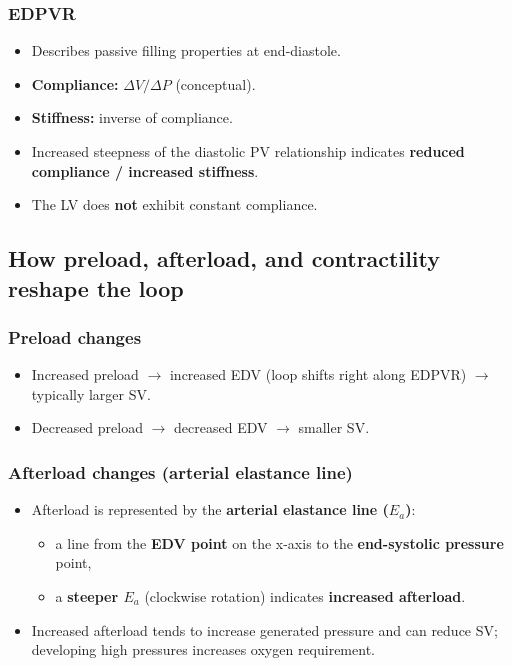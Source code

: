 \documentclass[11pt,a4paper]{article}
\begin{document}
\subsubsection{EDPVR}
\begin{itemize}
\item Describes passive filling properties at end-diastole.
\item \textbf{Compliance:} $\Delta V/\Delta P$ (conceptual).
\item \textbf{Stiffness:} inverse of compliance.
\item Increased steepness of the diastolic PV relationship indicates \textbf{reduced compliance / increased stiffness}.
\item The LV does \textbf{not} exhibit constant compliance.
\end{itemize}

\subsection{How preload, afterload, and contractility reshape the loop}

\subsubsection{Preload changes}
\begin{itemize}
\item Increased preload $\rightarrow$ increased EDV (loop shifts right along EDPVR) $\rightarrow$ typically larger SV.
\item Decreased preload $\rightarrow$ decreased EDV $\rightarrow$ smaller SV.
\end{itemize}

\subsubsection{Afterload changes (arterial elastance line)}
\begin{itemize}
\item Afterload is represented by the \textbf{arterial elastance line ($E_a$)}:
  \begin{itemize}
  \item a line from the \textbf{EDV point} on the x-axis to the \textbf{end-systolic pressure} point,
  \item a \textbf{steeper $E_a$} (clockwise rotation) indicates \textbf{increased afterload}.
  \end{itemize}
\item Increased afterload tends to increase generated pressure and can reduce SV; developing high pressures increases oxygen requirement.
\end{itemize}
\end{document}
